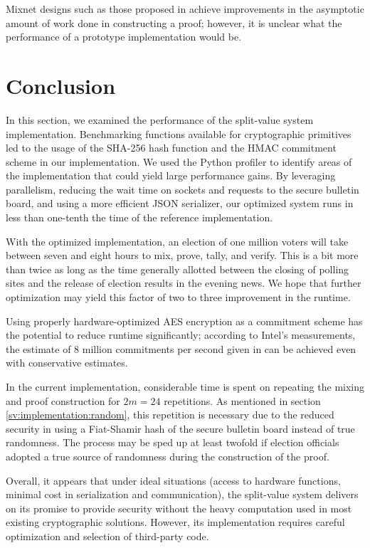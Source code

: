 Mixnet designs such as those proposed in \cite{chase13} achieve improvements in the asymptotic amount of work done in constructing a proof; however, it is unclear what the performance of a prototype implementation would be.

\section{Conclusion} \label{perf:conclusion}

In this section, we examined the performance of the split-value system implementation. Benchmarking functions available for cryptographic primitives led to the usage of the SHA-256 hash function and the HMAC commitment scheme in our implementation. We used the Python profiler to identify areas of the implementation that could yield large performance gains. By leveraging parallelism, reducing the wait time on sockets and requests to the secure bulletin board, and using a more efficient JSON serializer, our optimized system runs in less than one-tenth the time of the reference implementation.

With the optimized implementation, an election of one million voters will take between seven and eight hours to mix, prove, tally, and verify. This is a bit more than twice as long as the time generally allotted between the closing of polling sites and the release of election results in the evening news. We hope that further optimization may yield this factor of two to three improvement in the runtime.

Using properly hardware-optimized AES encryption as a commitment scheme has the potential to reduce runtime significantly; according to Intel's measurements, the estimate of 8 million commitments per second given in \cite{rrv} can be achieved even with conservative estimates.

In the current implementation, considerable time is spent on repeating the mixing and proof construction for $2m = 24$ repetitions. As mentioned in section \ref{sv:implementation:random}, this repetition is necessary due to the reduced security in using a Fiat-Shamir hash of the secure bulletin board instead of true randomness. The process may be sped up at least twofold if election officials adopted a true source of randomness during the construction of the proof.

Overall, it appears that under ideal situations (access to hardware functions, minimal cost in serialization and communication), the split-value system delivers on its promise to provide security without the heavy computation used in most existing cryptographic solutions. However, its implementation requires careful optimization and selection of third-party code.
